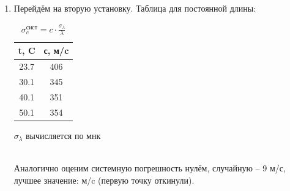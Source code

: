 \documentclass[11pt,a4paper]{article}
\begin{document}
\begin{enumerate}
  \item Перейдём на вторую установку. Таблица для постоянной длины:
  \begin{table}[h!]
    \begin{center}
    \begin{tabular}{|c|c|}
    \hline
    t, C & с, м/c \\ \hline
    23.7 & 406  \\ \hline
    30.1 & 345  \\ \hline
    40.1 & 351  \\ \hline
    50.1 & 354  \\ \hline
    \end{tabular}
    \caption{$\sigma_c^\text{сист} = c \cdot \frac{\sigma_\lambda}{\lambda}$}
    \end{center}
    $\sigma_\lambda$ вычисляется по мнк
\end{table}\\
Аналогично оценим системную погрешность нулём, случайную -- 9
 м/с, лучшее значение:  м/c (первую точку откинули).


\end{enumerate}
\end{document}
